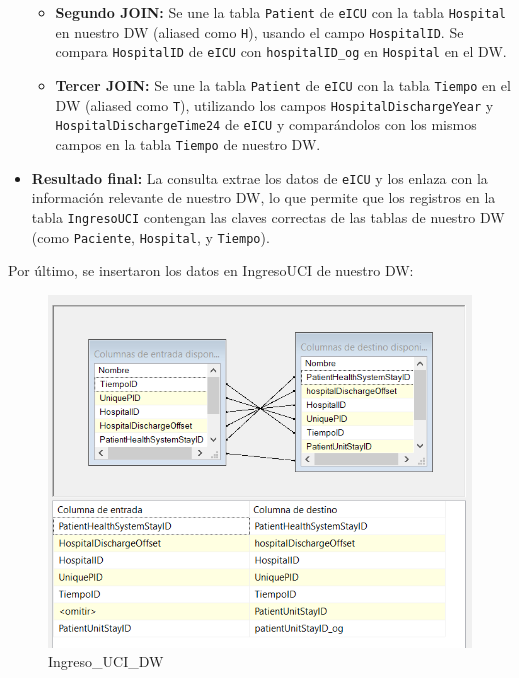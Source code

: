 \documentclass[12pt, a4paper, twoside]{article}
\begin{document}
\begin{itemize}
\begin{itemize}
			\item \textbf{Segundo JOIN:} Se une la tabla \texttt{Patient} de \texttt{eICU} con la tabla \texttt{Hospital} en nuestro DW (aliased como \texttt{H}), usando el campo \texttt{HospitalID}. Se compara \texttt{HospitalID} de \texttt{eICU} con \texttt{hospitalID\_og} en \texttt{Hospital} en el DW.
			
			\item \textbf{Tercer JOIN:} Se une la tabla \texttt{Patient} de \texttt{eICU} con la tabla \texttt{Tiempo} en el DW (aliased como \texttt{T}), utilizando los campos \texttt{HospitalDischargeYear} y \texttt{HospitalDischargeTime24} de \texttt{eICU} y comparándolos con los mismos campos en la tabla \texttt{Tiempo} de nuestro DW.
		\end{itemize}
		
		\item \textbf{Resultado final:} La consulta extrae los datos de \texttt{eICU} y los enlaza con la información relevante de nuestro DW, lo que permite que los registros en la tabla \texttt{IngresoUCI} contengan las claves correctas de las tablas de nuestro DW (como \texttt{Paciente}, \texttt{Hospital}, y \texttt{Tiempo}).
	\end{itemize}
	
	Por último, se insertaron los datos en IngresoUCI de nuestro DW:
	
	\begin{figure}[h!]
		\centering
		\includegraphics[width=1\textwidth]{image/110_carga_ingreso_destino.png}
		\caption{Ingreso\_UCI\_DW}
		\label{fig:28}
	\end{figure}
	
\end{document}
